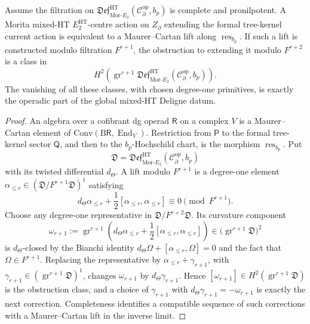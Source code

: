 \begin{prop}
\label{app:prop:morita-centre-lift-MC-control}
Assume the filtration on
\(\mathfrak{Def}^{\mathrm{HT}}_{\mathrm{Mor}\mbox{-}E_2}
(\mathcal C^{\mathrm{op}}_\partial,b_p)\) is complete and pronilpotent.
A Morita mixed-HT \(E_2^{\mathrm{HT}}\)-centre action on
\(Z_\partial\) extending the formal tree-kernel current action is
equivalent to a Maurer--Cartan lift along
\(\operatorname{res}_{b_p}\).  If such a lift is constructed modulo
filtration \(F^{r+1}\), the obstruction to extending it modulo
\(F^{r+2}\) is a class in
\[
  H^2\!\left(
    \operatorname{gr}^{r+1}
    \mathfrak{Def}^{\mathrm{HT}}_{\mathrm{Mor}\mbox{-}E_2}
      (\mathcal C^{\mathrm{op}}_\partial,b_p)
  \right).
\]
The vanishing of all these classes, with chosen degree-one primitives,
is exactly the operadic part of the global mixed-HT Deligne datum.
\end{prop}

\begin{proof}
An algebra over a cofibrant dg operad \(\mathsf R\) on a complex \(V\) is
a Maurer--Cartan element of
\(\mathrm{Conv}(\mathrm B\mathsf R,\operatorname{End}_V)\).  Restriction
from \(\mathsf P\) to the formal tree-kernel sector \(\mathsf Q\), and
then to the \(b_p\)-Hochschild chart, is the morphism
\(\operatorname{res}_{b_p}\).  Put
\[
  \mathfrak D=
  \mathfrak{Def}^{\mathrm{HT}}_{\mathrm{Mor}\mbox{-}E_2}
    (\mathcal C^{\mathrm{op}}_\partial,b_p)
\]
with its twisted differential \(d_\Theta\).  A lift modulo \(F^{r+1}\)
is a degree-one element
\(\alpha_{\le r}\in(\mathfrak D/F^{r+1}\mathfrak D)^1\) satisfying
\[
  d_\Theta\alpha_{\le r}
  +\frac12[\alpha_{\le r},\alpha_{\le r}]
  \equiv 0 \pmod {F^{r+1}} .
\]
Choose any degree-one representative in
\(\mathfrak D/F^{r+2}\mathfrak D\).  Its curvature component
\[
  \omega_{r+1}:=
  \operatorname{gr}^{r+1}\!\left(
    d_\Theta\alpha_{\le r}
    +\frac12[\alpha_{\le r},\alpha_{\le r}]
  \right)
  \in
  \bigl(\operatorname{gr}^{r+1}\mathfrak D\bigr)^2
\]
is \(d_\Theta\)-closed by the Bianchi identity
\(d_\Theta\Omega+[\alpha_{\le r},\Omega]=0\) and the fact that
\(\Omega\in F^{r+1}\).  Replacing the representative by
\(\alpha_{\le r}+\gamma_{r+1}\), with
\(\gamma_{r+1}\in(\operatorname{gr}^{r+1}\mathfrak D)^1\), changes
\(\omega_{r+1}\) by \(d_\Theta\gamma_{r+1}\).  Hence
\([\omega_{r+1}]\in H^2(\operatorname{gr}^{r+1}\mathfrak D)\) is the
obstruction class, and a choice of \(\gamma_{r+1}\) with
\(d_\Theta\gamma_{r+1}=-\omega_{r+1}\) is exactly the next correction.
Completeness identifies a compatible sequence of such corrections with
a Maurer--Cartan lift in the inverse limit.
\end{proof}

